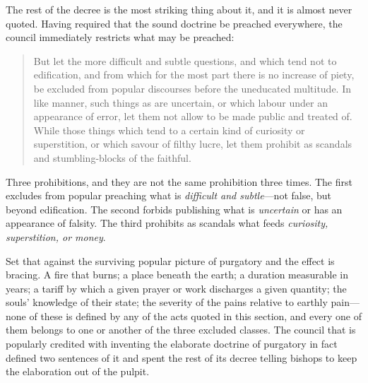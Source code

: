 The rest of the decree is the most striking thing about it, and it is almost never quoted. Having required that the sound doctrine be preached everywhere, the council immediately restricts what may be preached:

\begin{quote}
But let the more difficult and subtle questions, and which tend not to edification, and from which for the most part there is no increase of piety, be excluded from popular discourses before the uneducated multitude. In like manner, such things as are uncertain, or which labour under an appearance of error, let them not allow to be made public and treated of. While those things which tend to a certain kind of curiosity or superstition, or which savour of filthy lucre, let them prohibit as scandals and stumbling-blocks of the faithful.
\end{quote}

Three prohibitions, and they are not the same prohibition three times. The first excludes from popular preaching what is \emph{difficult and subtle}---not false, but beyond edification. The second forbids publishing what is \emph{uncertain} or has an appearance of falsity. The third prohibits as scandals what feeds \emph{curiosity, superstition, or money}.

Set that against the surviving popular picture of purgatory and the effect is bracing. A fire that burns; a place beneath the earth; a duration measurable in years; a tariff by which a given prayer or work discharges a given quantity; the souls' knowledge of their state; the severity of the pains relative to earthly pain---none of these is defined by any of the acts quoted in this section, and every one of them belongs to one or another of the three excluded classes. The council that is popularly credited with inventing the elaborate doctrine of purgatory in fact defined two sentences of it and spent the rest of its decree telling bishops to keep the elaboration out of the pulpit.

